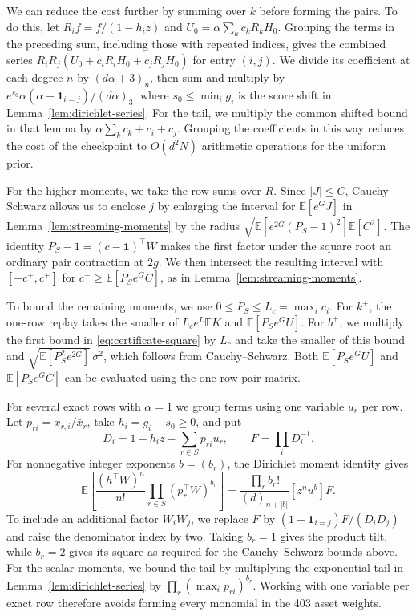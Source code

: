 \documentclass{article}
\numberwithin{equation}{section}
\theoremstyle{remark}
\newcommand{\E}{\mathbb E}
\newcommand{\one}{\mathbf 1}
\begin{document}
We can reduce the cost further by summing over $k$ before forming the
pairs. To do this, let $R_i f=f/(1-h_i z)$ and
$U_0=\alpha\sum_k c_k R_k H_0$. Grouping the terms in the preceding
sum, including those with repeated indices, gives the combined series
$R_iR_j(U_0+c_iR_iH_0+c_jR_jH_0)$ for entry $(i,j)$. We divide its
coefficient at each degree $n$ by $(d\alpha+3)_n$, then sum and multiply
by $e^{s_0}\alpha(\alpha+\mathbf 1_{i=j})/(d\alpha)_3$, where
$s_0\le\min_i g_i$ is the score shift in Lemma~\ref{lem:dirichlet-series}.
For the tail, we multiply the common shifted bound in that lemma by
$\alpha\sum_k c_k+c_i+c_j$. Grouping the coefficients in this way
reduces the cost of the checkpoint to $O(d^2N)$ arithmetic operations
for the uniform prior.

For the higher moments, we take the row sums over $R$. Since $|J|\le C$,
Cauchy--Schwarz allows us to enclose $j$ by enlarging the interval for
$\E[e^G J]$ in Lemma~\ref{lem:streaming-moments} by the radius
$\sqrt{\E[e^{2G}(P_S-1)^2]\E[C^2]}$. The identity
$P_S-1=(c-\one)^\top W$ makes the first factor under the square root
an ordinary pair contraction at $2g$. We then intersect the resulting
interval with $[-c^+,c^+]$ for $c^+\ge\E[P_S e^G C]$, as in
Lemma~\ref{lem:streaming-moments}.

To bound the remaining moments, we use $0\le P_S\le L_c=\max_i c_i$.
For $k^+$, the one-row replay takes the smaller of $L_c e^L\E K$ and
$\E[P_S e^G U]$. For $b^+$, we multiply the first bound in
\eqref{eq:certificate-square} by $L_c$ and take the smaller of this
bound and $\sqrt{\E[P_S^2e^{2G}]}\,\sigma^2$, which follows from
Cauchy--Schwarz. Both $\E[P_S e^G U]$ and $\E[P_S e^G C]$ can be
evaluated using the one-row pair matrix.

For several exact rows with $\alpha=1$ we group terms using one
variable $u_r$ per row. Let $p_{ri}=x_{r,i}/\bar x_r$, take
$h_i=g_i-s_0\ge0$, and put
\[
 D_i=1-h_i z-\sum_{r\in S}p_{ri}u_r,\qquad F=\prod_i D_i^{-1}.
\]
For nonnegative integer exponents $b=(b_r)$, the Dirichlet moment
identity gives
\[
 \E\!\left[\frac{(h^\top W)^n}{n!}
       \prod_{r\in S}(p_r^\top W)^{b_r}\right]
 = \frac{\prod_r b_r!}{(d)_{n+|b|}}[z^n u^b]F .
\]
To include an additional factor $W_iW_j$, we replace $F$ by
$(1+\mathbf1_{i=j})F/(D_iD_j)$ and raise the denominator index by
two. Taking $b_r=1$ gives the product tilt, while $b_r=2$ gives its
square as required for the Cauchy--Schwarz bounds above. For the
scalar moments, we bound the tail by multiplying the exponential tail
in Lemma~\ref{lem:dirichlet-series} by
$\prod_r(\max_i p_{ri})^{b_r}$. Working with one variable per exact
row therefore avoids forming every monomial in the 403 asset weights.
\end{document}
